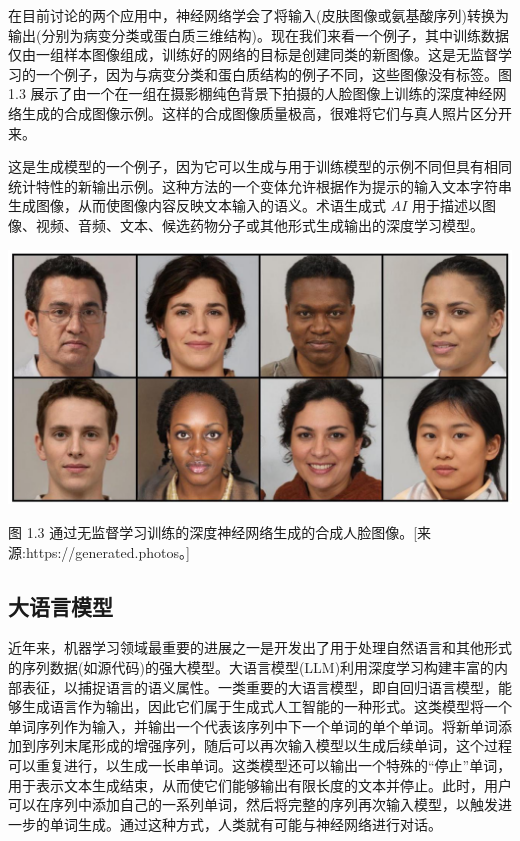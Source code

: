 \documentclass[10pt]{article}
\begin{document}
在目前讨论的两个应用中，神经网络学会了将输入(皮肤图像或氨基酸序列)转换为输出(分别为病变分类或蛋白质三维结构)。现在我们来看一个例子，其中训练数据仅由一组样本图像组成，训练好的网络的目标是创建同类的新图像。这是无监督学习的一个例子，因为与病变分类和蛋白质结构的例子不同，这些图像没有标签。图 1.3 展示了由一个在一组在摄影棚纯色背景下拍摄的人脸图像上训练的深度神经网络生成的合成图像示例。这样的合成图像质量极高，很难将它们与真人照片区分开来。

这是生成模型的一个例子，因为它可以生成与用于训练模型的示例不同但具有相同统计特性的新输出示例。这种方法的一个变体允许根据作为提示的输入文本字符串生成图像，从而使图像内容反映文本输入的语义。术语生成式 \({AI}\) 用于描述以图像、视频、音频、文本、候选药物分子或其他形式生成输出的深度学习模型。


\begin{center}
\includegraphics[max width=1.0\textwidth]{images/0194e279-9b28-703a-88f4-c3ac21e2010d_24_231_352_1337_677_0.jpg}
\end{center}
\hspace*{3em} 

图 1.3 通过无监督学习训练的深度神经网络生成的合成人脸图像。[来源:https://generated.photos。]

\subsection{大语言模型}

近年来，机器学习领域最重要的进展之一是开发出了用于处理自然语言和其他形式的序列数据(如源代码)的强大模型。大语言模型(LLM)利用深度学习构建丰富的内部表征，以捕捉语言的语义属性。一类重要的大语言模型，即自回归语言模型，能够生成语言作为输出，因此它们属于生成式人工智能的一种形式。这类模型将一个单词序列作为输入，并输出一个代表该序列中下一个单词的单个单词。将新单词添加到序列末尾形成的增强序列，随后可以再次输入模型以生成后续单词，这个过程可以重复进行，以生成一长串单词。这类模型还可以输出一个特殊的“停止”单词，用于表示文本生成结束，从而使它们能够输出有限长度的文本并停止。此时，用户可以在序列中添加自己的一系列单词，然后将完整的序列再次输入模型，以触发进一步的单词生成。通过这种方式，人类就有可能与神经网络进行对话。
\end{document}
